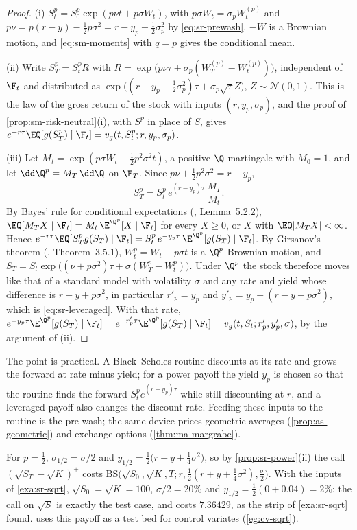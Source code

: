 \begin{proof}
(i) $S^p_t=S_0^p\exp(p\nu t+p\sigma W_t)$, with $p\sigma W_t=\sigma_pW^{(p)}_t$ and
$p\nu=p(r-y)-\frac12p\sigma^2=r-y_p-\frac12\sigma_p^2$ by \eqref{eq:sr-prewash}. $-W$ is a Brownian motion, and
\eqref{eq:sm-moments} with $q=p$ gives the conditional mean.

(ii) Write $S^p_T=S^p_tR$ with $R=\exp\big(p\nu\tau+\sigma_p(W^{(p)}_T-W^{(p)}_t)\big)$, independent of $\F_t$ and
distributed as $\exp\big((r-y_p-\frac12\sigma_p^2)\tau+\sigma_p\sqrt\tau Z\big)$, $Z\sim\mathcal N(0,1)$. This is the
law of the gross return of the stock with inputs $(r,y_p,\sigma_p)$, and the proof of
\cref{prop:sm-risk-neutral}(i), with $S^p$ in place of $S$, gives $e^{-r\tau}\EQ[g(S^p_T)\mid\F_t]=v_g(t,S^p_t;r,y_p,\sigma_p)$.

(iii) Let $M_t=\exp(p\sigma W_t-\frac12p^2\sigma^2t)$, a positive $\Q$-martingale with $M_0=1$, and let
$\dd\Q^p=M_T\,\dd\Q$ on $\F_T$. Since $p\nu+\frac12p^2\sigma^2=r-y_p$,
\[
  S^p_T=S^p_t\,e^{(r-y_p)\tau}\,\frac{M_T}{M_t}.
\]
By Bayes' rule for conditional expectations (\textcite{shreve2}, Lemma~5.2.2),
$\EQ[M_TX\mid\F_t]=M_t\,\E^{\Q^p}[X\mid\F_t]$ for every $X\ge0$, or $X$ with $\EQ|M_TX|<\infty$. Hence
$e^{-r\tau}\EQ[S^p_Tg(S_T)\mid\F_t]=S^p_t\,e^{-y_p\tau}\,\E^{\Q^p}[g(S_T)\mid\F_t]$. By Girsanov's theorem
(\textcite{karatzas-shreve}, Theorem~3.5.1), $W^p_t=W_t-p\sigma t$ is a $\Q^p$-Brownian motion, and
$S_T=S_t\exp\big((\nu+p\sigma^2)\tau+\sigma(W^p_T-W^p_t)\big)$. Under $\Q^p$ the stock therefore moves like
that of a standard model with volatility $\sigma$ and any rate and yield whose difference is
$r-y+p\sigma^2$, in particular $r'_p=y_p$ and $y'_p=y_p-(r-y+p\sigma^2)$, which is \eqref{eq:sr-leveraged}.
With that rate, $e^{-y_p\tau}\E^{\Q^p}[g(S_T)\mid\F_t]=e^{-r'_p\tau}\E^{\Q^p}[g(S_T)\mid\F_t]=v_g(t,S_t;r'_p,y'_p,\sigma)$,
by the argument of (ii).
\end{proof}

The point is practical. A Black--Scholes routine discounts at its rate and grows the forward at rate minus
yield; for a power payoff the yield $y_p$ is chosen so that the routine finds the forward
$S_t^pe^{(r-y_p)\tau}$ while still discounting at $r$, and a leveraged payoff also changes the discount rate.
Feeding these inputs to the routine is the pre-wash; the same device prices geometric averages
(\cref{prop:as-geometric}) and exchange options (\cref{thm:ma-margrabe}).

\begin{example}\label{exa:sr-prewash}
For $p=\frac12$, $\sigma_{1/2}=\sigma/2$ and $y_{1/2}=\frac12\big(r+y+\frac14\sigma^2\big)$, so by
\cref{prop:sr-power}(ii) the call $(\sqrt{S_T}-\sqrt K)^+$ costs
$\mathrm{BS}\big(\sqrt{S_0},\sqrt K,T;r,\frac12(r+y+\frac14\sigma^2),\frac\sigma2\big)$. With the inputs of
\cref{exa:sr-sqrt}, $\sqrt{S_0}=\sqrt K=100$, $\sigma/2=20\%$ and $y_{1/2}=\frac12(0+0.04)=2\%$: the call on
$\sqrt S$ is exactly the test case, and costs $7.36429$, as
the strip of \cref{exa:sr-sqrt} found.  uses this payoff as a test bed for
control variates (\cref{eg:cv-sqrt}).
\end{example}

